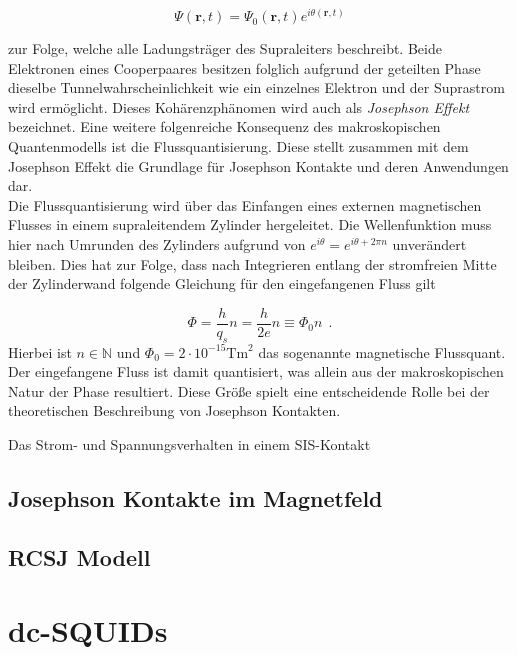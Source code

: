 \begin{equation}
\Psi(\textbf{r},t) = \Psi_0(\textbf{r},t)e^{i\theta(\textbf{r},t)}
\end{equation}

zur Folge, welche alle Ladungsträger des Supraleiters beschreibt. Beide Elektronen eines Cooperpaares besitzen folglich aufgrund der geteilten Phase dieselbe Tunnelwahrscheinlichkeit wie ein einzelnes Elektron und der Suprastrom wird ermöglicht. 
Dieses Kohärenzphänomen wird auch als \textit{Josephson Effekt} bezeichnet.
Eine weitere folgenreiche Konsequenz des makroskopischen Quantenmodells ist die Flussquantisierung. Diese stellt zusammen  mit dem Josephson Effekt die Grundlage für Josephson Kontakte und deren Anwendungen dar. \\ 

Die Flussquantisierung wird über das Einfangen eines externen magnetischen Flusses in einem supraleitendem Zylinder hergeleitet. Die Wellenfunktion muss hier nach Umrunden des Zylinders aufgrund von $e^{i\theta}=e^{i\theta + 2\pi n}$ unverändert bleiben. Dies hat zur Folge, dass nach Integrieren entlang der stromfreien Mitte der Zylinderwand folgende Gleichung für den eingefangenen Fluss gilt

\begin{equation}
\Phi = \frac{h}{q_s}n = \frac{h}{2e}n \equiv \Phi_0n \ \ .
\end{equation}
Hierbei ist $n\in\mathbb{N}$ und $\Phi_0 = 2\cdot 10^{-15} \text{Tm}^2$ das sogenannte magnetische Flussquant. Der eingefangene Fluss ist damit quantisiert, was allein aus der makroskopischen Natur der Phase resultiert. Diese Größe spielt eine entscheidende Rolle bei der theoretischen Beschreibung von Josephson Kontakten. 

Das Strom- und Spannungsverhalten in einem SIS-Kontakt 



\subsection{Josephson Kontakte im Magnetfeld}

\Blindtext

\subsection{RCSJ Modell}

\section{dc-SQUIDs}

